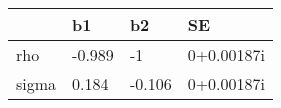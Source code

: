 \begin{tabular}{llll}
\hline 
  & b1 & b2 & SE \\ 
\hline 
rho & -0.989 & -1 & 0+0.00187i \\ 
sigma & 0.184 & -0.106 & 0+0.00187i \\ 
\hline 
\end{tabular}
